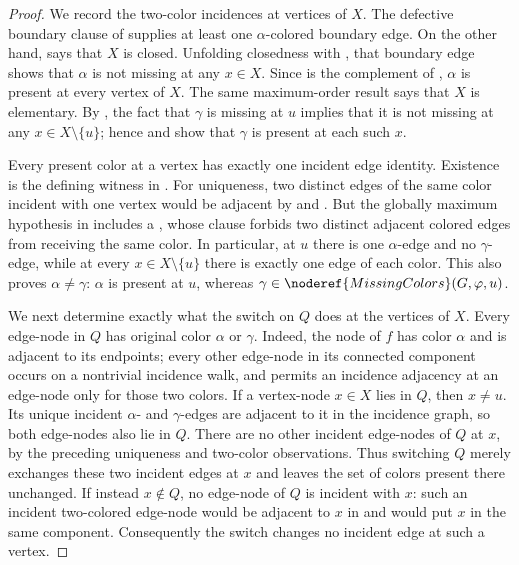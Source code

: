 \begin{proof}
We record the two-color incidences at vertices of $X$.  The defective
boundary clause of  supplies
at least one $\alpha$-colored boundary edge.  On the other hand,
 says that $X$ is closed.  Unfolding
closedness with , that boundary edge shows
that $\alpha$ is not missing at any $x\in X$.  Since
 is the complement of
, $\alpha$ is present at every vertex of $X$.
The same maximum-order result says that $X$ is elementary.  By
, the fact that $\gamma$ is missing
at $u$ implies that it is not missing at any $x\in X\setminus\{u\}$;
hence  and  show that
$\gamma$ is present at each such $x$.

Every present color at a vertex has exactly one incident edge identity.
Existence is the defining witness in .  For
uniqueness, two distinct edges of the same color incident with one vertex
would be adjacent by  and .  But
the globally maximum hypothesis in  includes
a , whose  clause forbids
two distinct adjacent colored edges from receiving the same color.  In
particular, at $u$ there is one $\alpha$-edge and no $\gamma$-edge, while
at every $x\in X\setminus\{u\}$ there is exactly one edge of each color.
This also proves $\alpha\ne\gamma$: $\alpha$ is present at $u$, whereas
$\gamma\in\noderef{MissingColors}(G,\varphi,u)$.

We next determine exactly what the switch on $Q$ does at the vertices of
$X$.  Every edge-node in $Q$ has original color $\alpha$ or $\gamma$.
Indeed, the node of $f$ has color $\alpha$ and is adjacent to its
endpoints; every other edge-node in its connected component occurs on a
nontrivial incidence walk, and  permits
an incidence adjacency at an edge-node only for those two colors.  If a
vertex-node $x\in X$ lies in $Q$, then $x\ne u$.  Its unique incident
$\alpha$- and $\gamma$-edges are adjacent to it in the incidence graph,
so both edge-nodes also lie in $Q$.  There are no other incident edge-nodes
of $Q$ at $x$, by the preceding uniqueness and two-color observations.
Thus switching $Q$ merely exchanges these two incident edges at $x$ and
leaves the set of colors present there unchanged.  If instead
$x\notin Q$, no edge-node of $Q$ is incident with $x$: such an incident
two-colored edge-node would be adjacent to $x$ in
 and would put $x$ in the same component.
Consequently the switch changes no incident edge at such a vertex.


\end{proof}
